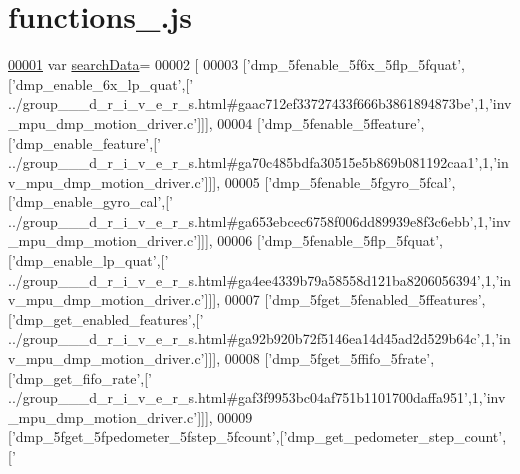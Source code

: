 \hypertarget{functions__2_8js_source}{}\section{functions\+\_.\+js}
\label{functions__2_8js_source}

\begin{DoxyCode}
\hypertarget{functions__2_8js_source.tex_l00001}{}\hyperlink{functions__2_8js_ad01a7523f103d6242ef9b0451861231e}{00001} var \hyperlink{functions__2_8js_ad01a7523f103d6242ef9b0451861231e}{searchData}=
00002 [
00003   [\textcolor{stringliteral}{'dmp\_5fenable\_5f6x\_5flp\_5fquat'},[\textcolor{stringliteral}{'dmp\_enable\_6x\_lp\_quat'},[\textcolor{stringliteral}{'
      ../group\_\_\_d\_r\_i\_v\_e\_r\_s.html#gaac712ef33727433f666b3861894873be'},1,\textcolor{stringliteral}{'inv\_mpu\_dmp\_motion\_driver.c'}]]],
00004   [\textcolor{stringliteral}{'dmp\_5fenable\_5ffeature'},[\textcolor{stringliteral}{'dmp\_enable\_feature'},[\textcolor{stringliteral}{'
      ../group\_\_\_d\_r\_i\_v\_e\_r\_s.html#ga70c485bdfa30515e5b869b081192caa1'},1,\textcolor{stringliteral}{'inv\_mpu\_dmp\_motion\_driver.c'}]]],
00005   [\textcolor{stringliteral}{'dmp\_5fenable\_5fgyro\_5fcal'},[\textcolor{stringliteral}{'dmp\_enable\_gyro\_cal'},[\textcolor{stringliteral}{'
      ../group\_\_\_d\_r\_i\_v\_e\_r\_s.html#ga653ebcec6758f006dd89939e8f3c6ebb'},1,\textcolor{stringliteral}{'inv\_mpu\_dmp\_motion\_driver.c'}]]],
00006   [\textcolor{stringliteral}{'dmp\_5fenable\_5flp\_5fquat'},[\textcolor{stringliteral}{'dmp\_enable\_lp\_quat'},[\textcolor{stringliteral}{'
      ../group\_\_\_d\_r\_i\_v\_e\_r\_s.html#ga4ee4339b79a58558d121ba8206056394'},1,\textcolor{stringliteral}{'inv\_mpu\_dmp\_motion\_driver.c'}]]],
00007   [\textcolor{stringliteral}{'dmp\_5fget\_5fenabled\_5ffeatures'},[\textcolor{stringliteral}{'dmp\_get\_enabled\_features'},[\textcolor{stringliteral}{'
      ../group\_\_\_d\_r\_i\_v\_e\_r\_s.html#ga92b920b72f5146ea14d45ad2d529b64c'},1,\textcolor{stringliteral}{'inv\_mpu\_dmp\_motion\_driver.c'}]]],
00008   [\textcolor{stringliteral}{'dmp\_5fget\_5ffifo\_5frate'},[\textcolor{stringliteral}{'dmp\_get\_fifo\_rate'},[\textcolor{stringliteral}{'
      ../group\_\_\_d\_r\_i\_v\_e\_r\_s.html#gaf3f9953bc04af751b1101700daffa951'},1,\textcolor{stringliteral}{'inv\_mpu\_dmp\_motion\_driver.c'}]]],
00009   [\textcolor{stringliteral}{'dmp\_5fget\_5fpedometer\_5fstep\_5fcount'},[\textcolor{stringliteral}{'dmp\_get\_pedometer\_step\_count'},[\textcolor{stringliteral}{'
}
\end{DoxyCode}
